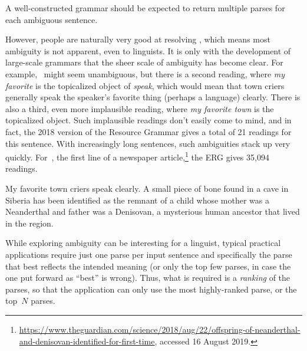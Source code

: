 \documentclass[output=paper
	        ,collection
	        ,collectionchapter
 	        ,biblatex
                ,babelshorthands
                ,newtxmath
                ,draftmode
                ,colorlinks, citecolor=brown
]{langscibook}
\begin{document}
\noindent
A well-constructed grammar should be expected to return multiple
parses for each ambiguous sentence.

However, people are naturally very good at resolving ,
which means most ambiguity is not apparent, even to linguists.
It is only with the development of large-scale grammars that the sheer scale of ambiguity has become clear.
For example, ~might seem unambiguous,
but there is a second reading, where \textit{my favorite} is the topicalized object of \textit{speak},
which would mean that town criers generally speak the speaker's favorite thing (perhaps a language) clearly.
There is also a third, even more implausible reading, where \textit{my favorite town} is the topicalized object.
Such implausible readings don't easily come to mind,
and in fact, the 2018 version of the  Resource Grammar \citep[ERG;][]{Flickinger2000a,Flickinger2011a-u}
gives a total of 21 readings for this sentence.
With increasingly long sentences, such ambiguities stack up very quickly.
For~, the first line of a newspaper article,\footnote{%
	\url{https://www.theguardian.com/science/2018/aug/22/offspring-of-neanderthal-and-denisovan-identified-for-first-time}, accessed 16 August 2019.}
the ERG gives 35,094 readings.

\begin{exe}
\ex\label{cl:ex:ambig-simple}
My favorite town criers speak clearly.
\ex\label{cl:ex:ambig-many}
A small piece of bone found in a cave in Siberia has been identified
as the remnant of a child whose mother was a Neanderthal and father was a Denisovan,
a mysterious human ancestor that lived in the region.
\end{exe}

While exploring ambiguity can be interesting for a linguist,
typical practical applications require just one parse per input sentence
and specifically the parse that best reflects the intended meaning
(or only the top few parses, in case the one put forward as ``best'' is wrong).
Thus, what is required is a \textit{ranking} of the parses,
so that the application can only use the most highly-ranked parse,
or the top~$N$ parses.
\end{document}
